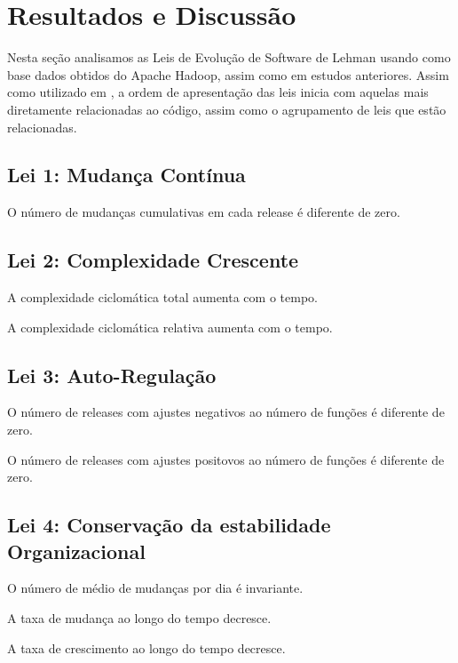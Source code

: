 \section{Resultados e Discussão}

Nesta seção analisamos as Leis de Evolução de Software de Lehman usando como base dados obtidos do Apache Hadoop, assim como em estudos anteriores\cite{israeli2010linux,lehman1996laws,lehman1980programs}. Assim como utilizado em \cite{israeli2010linux}, a ordem de apresentação das leis inicia com aquelas mais diretamente relacionadas ao código, assim como o agrupamento de leis que estão relacionadas.

\subsection{Lei 1: Mudança Contínua}

\begin{hypothesis}
	O número de mudanças cumulativas em cada release é diferente de zero.
\end{hypothesis}
\subsection{Lei 2: Complexidade Crescente}

\begin{hypothesis}
	A complexidade ciclomática total aumenta com o tempo.
\end{hypothesis}
\begin{hypothesis}
	A complexidade ciclomática relativa aumenta com o tempo.
\end{hypothesis}
\subsection{Lei 3: Auto-Regulação}

\begin{hypothesis}
	O número de releases com ajustes negativos ao número de funções é diferente de zero.
\end{hypothesis}
\begin{hypothesis}
		O número de releases com ajustes positovos ao número de funções é diferente de zero.
\end{hypothesis}

\subsection{Lei 4: Conservação da estabilidade Organizacional}
\begin{hypothesis}
	O número de médio de mudanças por dia é invariante.
\end{hypothesis}
\begin{hypothesis}
	A taxa de mudança ao longo do tempo decresce.
\end{hypothesis}
\begin{hypothesis}
	A taxa de crescimento ao longo do tempo decresce.
\end{hypothesis}

